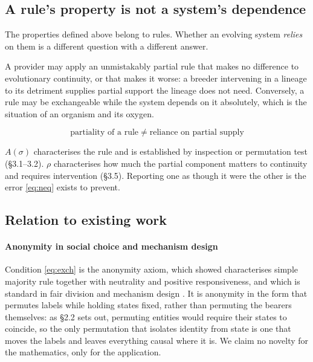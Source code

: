 \documentclass[review,3p,times]{elsarticle}
\begin{document}
\subsection{A rule's property is not a system's dependence}

The properties defined above belong to rules. Whether an evolving system
\emph{relies} on them is a different question with a different answer.

A provider may apply an unmistakably partial rule that makes no difference
to evolutionary continuity, or that makes it worse: a breeder intervening
in a lineage to its detriment supplies partial support the lineage does not
need. Conversely, a rule may be exchangeable while the system depends on it
absolutely, which is the situation of an organism and its oxygen.

\begin{equation}
\boxed{
\;\text{partiality of a rule}
\;\neq\;
\text{reliance on partial supply}\;
}
\label{eq:neq}
\end{equation}

$A(\sigma)$ characterises the rule and is established by inspection or
permutation test (\S3.1--3.2). $\rho$ characterises how much the partial
component matters to continuity and requires intervention (\S3.5).
Reporting one as though it were the other is the error \eqref{eq:neq}
exists to prevent.

\subsection{Relation to existing work}

\paragraph{Anonymity in social choice and mechanism design}
Condition \eqref{eq:exch} is the anonymity axiom, which \citet{may1952} showed
characterises simple majority rule together with neutrality and positive
responsiveness, and which is standard in fair division and mechanism design
\citep{moulin2003}. It is anonymity in the form that permutes labels while
holding states fixed, rather than permuting the bearers themselves: as \S2.2
sets out, permuting entities would require their states to coincide, so the
only permutation that isolates identity from state is one that moves the
labels and leaves everything causal where it is. We claim no novelty for the
mathematics, only for the application.
\end{document}
